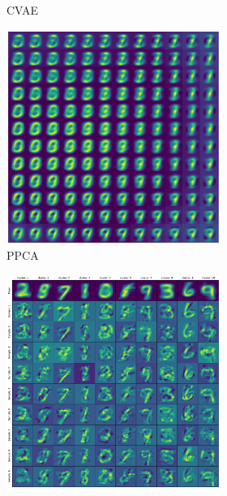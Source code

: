 \begin{figure}
\begin{floatrow}
{\begin{subfigure}[t]{0.45\textwidth}
\begin{subfigure}[t]{0.49\textwidth}
			\caption{CVAE}
			\label{fig:cvae:interpolation}
		\end{subfigure}
		\begin{subfigure}[t]{0.49\textwidth}
			\centering
			\includegraphics[width = 1\textwidth]{figures/ppca/interpolation}
			\caption{PPCA}
			\label{fig:ppca:interpolation}
		\end{subfigure}
		\begin{subfigure}[t]{0.49\textwidth}
			\centering
			\includegraphics[width = 1\textwidth]{figures/gmm/interpolation}

\end{subfigure}
\end{subfigure}}
\end{floatrow}
\end{figure}
